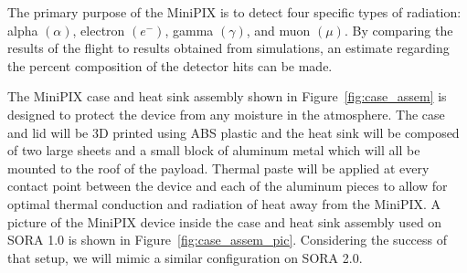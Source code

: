 The primary purpose of the MiniPIX is to detect four specific types of radiation: alpha $(\alpha)$, electron $({e^-})$, gamma $({\gamma})$, and muon $({\mu})$. By comparing the results of the flight to results obtained from simulations, an estimate regarding the percent composition of the detector hits can be made.

The MiniPIX case and heat sink assembly shown in Figure~\ref{fig:case_assem} is designed to protect the device from any moisture in the atmosphere. The case and lid will be 3D printed using ABS plastic and the heat sink will be composed of two large sheets and a small block of aluminum metal which will all be mounted to the roof of the payload. Thermal paste will be applied at every contact point between the device and each of the aluminum pieces to allow for optimal thermal conduction and radiation of heat away from the MiniPIX. A picture of the MiniPIX device inside the case and heat sink assembly used on SORA 1.0 is shown in Figure~\ref{fig:case_assem_pic}. Considering the success of that setup, we will mimic a similar configuration on SORA 2.0.



